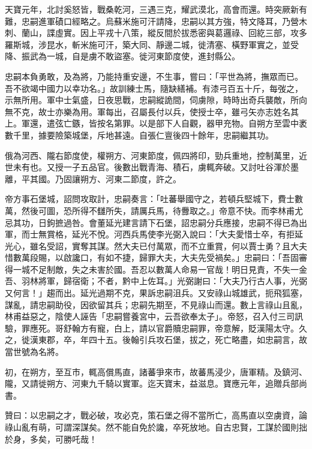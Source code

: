 \begin{pinyinscope}
 天寶元年，北討奚怒皆，戰桑乾河，三遇三克，耀武漠北，高會而還。時突厥新有難，忠嗣進軍磧口經略之。烏蘇米施可汗請降，忠嗣以其方強，特文降耳，乃營木刺、蘭山，諜虛實。因上平戎十八策，縱反間於拔悉密與葛邏祿、回紇三部，攻多羅斯城，涉昆水，斬米施可汗，築大同、靜邊二城，徙清塞、橫野軍實之，並受降、振武為一城，自是虜不敢盜塞。徙河東節度使，進封縣公。



 忠嗣本負勇敢，及為將，乃能持重安邊，不生事，嘗曰：「平世為將，撫眾而已。吾不欲竭中國力以幸功名。」故訓練士馬，隨缺繕補。有漆弓百五十斤，每弢之，示無所用。軍中士氣盛，日夜思戰，忠嗣縱詭間，伺虜隙，時時出奇兵襲敵，所向無不克，故士亦樂為用。軍每出，召屬長付以兵，使授士卒，雖弓矢亦志姓名其上。軍還，遣弦亡鏃，皆按名第罪。以是部下人自觀，器甲充物。自朔方至雲中袤數千里，據要險築城堡，斥地甚遠。自張仁亶後四十餘年，忠嗣繼其功。



 俄為河西、隴右節度使，權朔方、河東節度，佩四將印，勁兵重地，控制萬里，近世未有也。又授一子五品官。後數出戰青海、積石，虜輒奔破。又討吐谷渾於墨離，平其國。乃固讓朔方、河東二節度，許之。



 帝方事石堡城，詔問攻取計，忠嗣奏言：「吐蕃舉國守之，若頓兵堅城下，費士數萬，然後可圖，恐所得不讎所失，請厲兵馬，待釁取之。」帝意不快。而李林甫尤忌其功，日鉤摭過咎。會董延光建言請下石堡，詔忠嗣分兵應接，忠嗣不得已為出軍，而士無賞格，延光不悅。河西兵馬使李光弼入說曰：「大夫愛惜士卒，有拒延光心，雖名受詔，實奪其謀。然大夫已付萬眾，而不立重賞，何以賈士勇？且大夫惜數萬段賜，以啟讒口，有如不捷，歸罪大夫，大夫先受禍矣。」忠嗣曰：「吾固審得一城不足制敵，失之未害於國。吾忍以數萬人命易一官哉！明日見責，不失一金吾、羽林將軍，歸宿衛；不者，黔中上佐耳。」光弼謝曰：「大夫乃行古人事，光弼又何言！」趨而出。延光過期不克，果訴忠嗣沮兵。又安祿山城雄武，扼飛狐塞，謀亂，請忠嗣助役，因欲留其兵；忠嗣先期至，不見祿山而還。數上言祿山且亂，林甫益惡之，陰使人誣告「忠嗣嘗養宮中，云吾欲奉太子」。帝怒，召入付三司訊驗，罪應死。哥舒翰方有寵，白上，請以官爵贖忠嗣罪，帝意解，貶漢陽太守。久之，徙漢東郡，卒，年四十五。後翰引兵攻石堡，拔之，死亡略盡，如忠嗣言，故當世號為名將。



 初，在朔方，至互市，輒高償馬直，諸蕃爭來市，故蕃馬浸少，唐軍精。及鎮河、隴，又請徙朔方、河東九千騎以實軍。迄天寶末，益滋息。寶應元年，追贈兵部尚書。



 贊曰：以忠嗣之才，戰必破，攻必克，策石堡之得不當所亡，高馬直以空虜資，論祿山亂有萌，可謂深謀矣。然不能自免於讒，卒死放地。自古忠賢，工謀於國則拙於身，多矣，可勝吒哉！




\end{pinyinscope}
